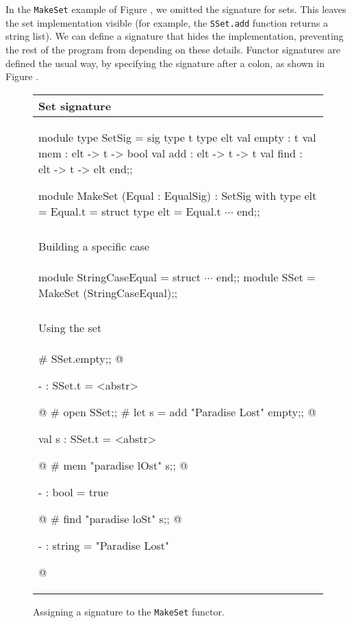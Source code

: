 
In the \hbox{\lstinline/MakeSet/} example of Figure ,
we omitted the signature for sets. This leaves the set implementation
visible (for example, the \hbox{\lstinline/SSet.add/} function returns
a string list).  We can define a signature that hides the
implementation, preventing the rest of the program from depending on
these details.  Functor signatures are defined the usual way, by
specifying the signature after a colon, as shown in
Figure .

\begin{figure}
\begin{center}
\begin{tabular}[t]{l}
Set signature\\
\hline
\begin{ocamllisting}
module type SetSig = sig
   type t
   type elt
   val empty : t
   val mem   : elt -> t -> bool
   val add   : elt -> t -> t
   val find  : elt -> t -> elt
end;;

module MakeSet (Equal : EqualSig)
 : SetSig with type elt = Equal.t =
struct
   type elt = Equal.t
   $\cdots$
end;;
\end{ocamllisting}\\
\\
Building a specific case\\
\hline
\begin{ocamllisting}
module StringCaseEqual = struct $\cdots$ end;;
module SSet = MakeSet (StringCaseEqual);;
\end{ocamllisting}\\
\\
Using the set\\
\hline
\begin{ocaml}
# SSet.empty;;
@
\begin{topoutput}
- : SSet.t = <abstr>
\end{topoutput}
@
# open SSet;;
# let s = add "Paradise Lost" empty;;
@
\begin{topoutput}
val s : SSet.t = <abstr>
\end{topoutput}
@
# mem "paradise lOst" s;;
@
\begin{topoutput}
- : bool = true
\end{topoutput}
@
# find "paradise loSt" s;;
@
\begin{topoutput}
- : string = "Paradise Lost"
\end{topoutput}
@
\end{ocaml}
\end{tabular}
\end{center}
\caption{Assigning a signature to the \hbox{\lstinline$MakeSet$} functor.}
\end{figure}

